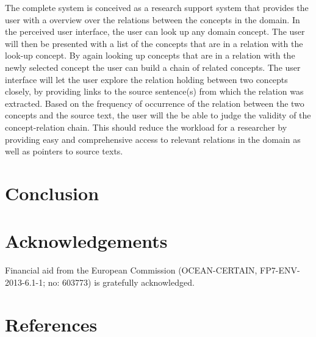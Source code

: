 \documentclass[10pt, a4paper]{article}
\begin{document}

The complete system is conceived as a research support system that provides the user with a overview over the relations between the concepts in the domain. 
In the perceived user interface, the user can look up any domain concept.
The user will then be presented with a list of the concepts that are in a relation with the look-up concept. 
By again looking up concepts that are in a relation with the newly selected concept the user can build a chain of related concepts.
The user interface will let the user explore the relation holding between two concepts closely, by providing links to the source sentence(s) from which the relation was extracted. 
Based on the frequency of occurrence of the relation between the two concepts and the source text, the user will the be able to judge the validity of the concept-relation chain.
This should reduce the workload for a researcher by providing easy and comprehensive access to relevant relations in the domain as well as pointers to source texts.

\section{Conclusion}



\section{Acknowledgements}

Financial aid from the European Commission (OCEAN-CERTAIN, FP7-ENV-2013-6.1-1; no: 603773) is gratefully acknowledged. 


\section{References}



\end{document}
